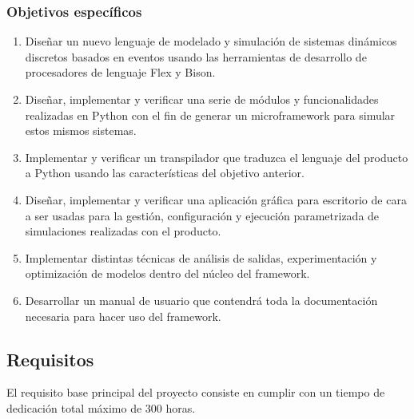 \subsubsection{Objetivos específicos}
\begin{enumerate}
    \item Diseñar un nuevo lenguaje de modelado y simulación de sistemas
    dinámicos discretos basados en eventos usando las herramientas de desarrollo
    de procesadores de lenguaje Flex y Bison.
    \item Diseñar, implementar y verificar una serie de módulos y
    funcionalidades realizadas en Python con el fin de generar un microframework
    para simular estos mismos sistemas.
    \item Implementar y verificar un transpilador que traduzca el lenguaje del
    producto a Python usando las características del objetivo anterior.
    \item Diseñar, implementar y verificar una aplicación gráfica para
    escritorio de cara a ser usadas para la gestión, configuración y
    ejecución parametrizada de simulaciones realizadas con el producto.
    \item Implementar distintas técnicas de análisis de salidas, experimentación
    y optimización de modelos dentro del núcleo del framework.
    \item Desarrollar un manual de usuario que contendrá toda la documentación
    necesaria para hacer uso del framework.
\end{enumerate}




\subsection{Requisitos}\label{subsec:requisitos}
El requisito base principal del proyecto consiste en cumplir con un tiempo de
dedicación total máximo de 300 horas.

